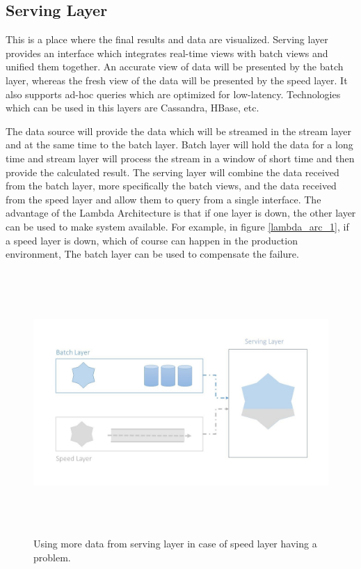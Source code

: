 \subsection{Serving Layer}
This is a place where the final results and data are visualized. Serving layer provides an interface which integrates real-time views with batch views and unified them together. An accurate view of data will be presented by the batch layer, whereas the fresh view of the data will be presented by the speed layer. It also supports ad-hoc queries which are optimized for low-latency. Technologies which can be used in this layers are Cassandra, HBase, etc.

The data source will provide the data which will be streamed in the stream layer and at the same time to the batch layer. Batch layer will hold the data for a long time and stream layer will process the stream in a window of short time and then provide the calculated result. The serving layer will combine the data received from the batch layer, more specifically the batch views, and the data received from the speed layer and allow them to query from a single interface. The advantage of the Lambda Architecture is that if one layer is down, the other layer can be used to make system available. For example, in figure \ref{lambda_arc_1}, if a speed layer is down, which of course can happen in the production environment, The batch layer can be used to compensate the failure.


\begin{figure}[htpb]
	\centering
	\includegraphics[width=12cm,height=10cm,keepaspectratio=true]{images/lambda_arc_1}
	\caption{
		Using more data from serving layer in case of speed layer having a problem.
	}
	\label{fig:lambda_arc_1}
\end{figure}

